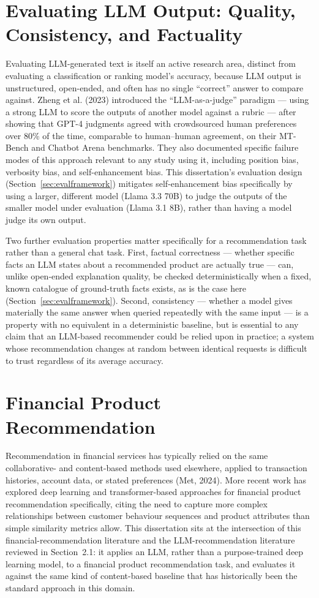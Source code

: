 \section{Evaluating LLM Output: Quality, Consistency, and Factuality}

Evaluating LLM-generated text is itself an active research area, distinct from evaluating a classification or ranking model's accuracy, because LLM output is unstructured, open-ended, and often has no single ``correct'' answer to compare against. Zheng et al. (2023) introduced the ``LLM-as-a-judge'' paradigm --- using a strong LLM to score the outputs of another model against a rubric --- after showing that GPT-4 judgments agreed with crowdsourced human preferences over 80\% of the time, comparable to human--human agreement, on their MT-Bench and Chatbot Arena benchmarks. They also documented specific failure modes of this approach relevant to any study using it, including position bias, verbosity bias, and self-enhancement bias. This dissertation's evaluation design (Section~\ref{sec:evalframework}) mitigates self-enhancement bias specifically by using a larger, different model (Llama 3.3 70B) to judge the outputs of the smaller model under evaluation (Llama 3.1 8B), rather than having a model judge its own output.

Two further evaluation properties matter specifically for a recommendation task rather than a general chat task. First, factual correctness --- whether specific facts an LLM states about a recommended product are actually true --- can, unlike open-ended explanation quality, be checked deterministically when a fixed, known catalogue of ground-truth facts exists, as is the case here (Section~\ref{sec:evalframework}). Second, consistency --- whether a model gives materially the same answer when queried repeatedly with the same input --- is a property with no equivalent in a deterministic baseline, but is essential to any claim that an LLM-based recommender could be relied upon in practice; a system whose recommendation changes at random between identical requests is difficult to trust regardless of its average accuracy.

\section{Financial Product Recommendation}

Recommendation in financial services has typically relied on the same collaborative- and content-based methods used elsewhere, applied to transaction histories, account data, or stated preferences (Met, 2024). More recent work has explored deep learning and transformer-based approaches for financial product recommendation specifically, citing the need to capture more complex relationships between customer behaviour sequences and product attributes than simple similarity metrics allow. This dissertation sits at the intersection of this financial-recommendation literature and the LLM-recommendation literature reviewed in Section~2.1: it applies an LLM, rather than a purpose-trained deep learning model, to a financial product recommendation task, and evaluates it against the same kind of content-based baseline that has historically been the standard approach in this domain.

